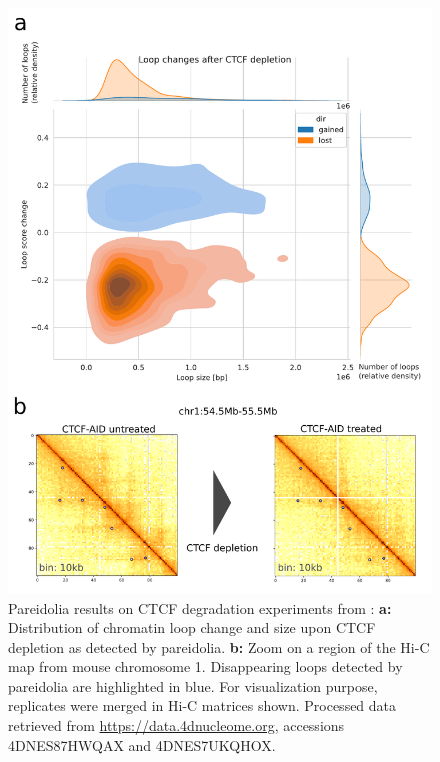 \begin{figure}[htb]
    \includegraphics[width=\textwidth]{Parts/Part02/gfx/pareidolia/ctcf_depletion_scores_genome.pdf}
    \caption[Pareidolia results on CTCF degradation experiments.]{Pareidolia results on CTCF degradation experiments from \cite{noraTargetedDegradationCTCF2017}: \textbf{a:} Distribution of chromatin loop change and size upon CTCF depletion as detected by pareidolia. \textbf{b:} Zoom on a region of the Hi-C map from mouse chromosome 1. Disappearing loops detected by pareidolia are highlighted in blue. For visualization purpose, replicates were merged in Hi-C matrices shown. Processed data retrieved from \url{https://data.4dnucleome.org}, accessions 4DNES87HWQAX and 4DNES7UKQHOX.}
    \label{fig:02-01:pareidolia-experimental}
\end{figure}